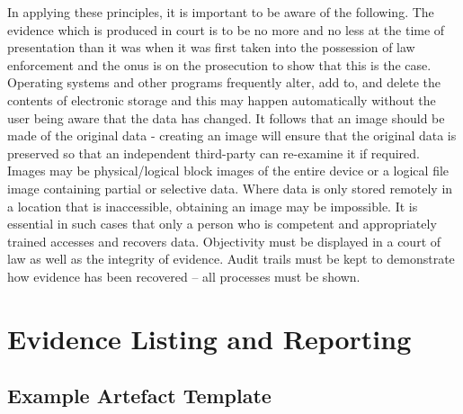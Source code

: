 \documentclass[12pt]{article}
\begin{document}
In applying these principles, it is important to be aware of the following. The evidence which is produced in court is to be no more and no less at the time of presentation than it was when it was first taken into the possession of law enforcement and the onus is on the prosecution to show that this is the case. Operating systems and other programs frequently alter, add to, and delete the contents of electronic storage and this may happen automatically without the user being aware that the data has changed. It follows that an image should be made of the original data - creating an image will ensure that the original data is preserved so that an independent third-party can re-examine it if required. Images may be physical/logical block images of the entire device or a logical file image containing partial or selective data. Where data is only stored remotely in a location that is inaccessible, obtaining an image may be impossible. It is essential in such cases that only a person who is competent and appropriately trained accesses and recovers data. Objectivity must be displayed in a court of law as well as the integrity of evidence. Audit trails must be kept to demonstrate how evidence has been recovered -- all processes must be shown.
\pagebreak
\section{Evidence Listing and Reporting}
\subsection{Example Artefact Template}
\end{document}
